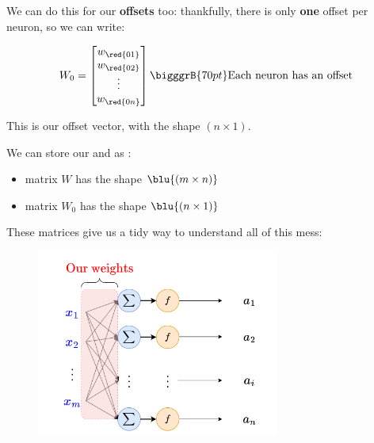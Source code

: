         We can do this for our \textbf{offsets} too: thankfully, there is only \textbf{one} offset per neuron, so we can write:
        
        \begin{equation}
            W_0 = 
                \begin{bmatrix}
                  w_{\red{01}} \\ w_{\red{02}} \\ \vdots \\ w_{\red{0n}}
                \end{bmatrix}
            \bigggrB{70pt} \text{Each neuron has an offset}
        \end{equation}
        
        This is our offset vector, with the shape $(n \times 1)$.\\
        
        \begin{notation}
            We can store our  and  as :
            
            \begin{itemize}
                \item {} matrix $W$ has the shape $\blu{(m \times n)}$
                
                \item {} matrix $W_0$ has the shape $\blu{(n \times 1)}$
            \end{itemize}
        \end{notation}
        
        These matrices give us a tidy way to understand all of this mess:
        
        \begin{figure}[H]
            \centering
            \includegraphics[width=80mm,scale=0.4]{images/nn_images/weights_highlighted.png}
        \end{figure}
        

